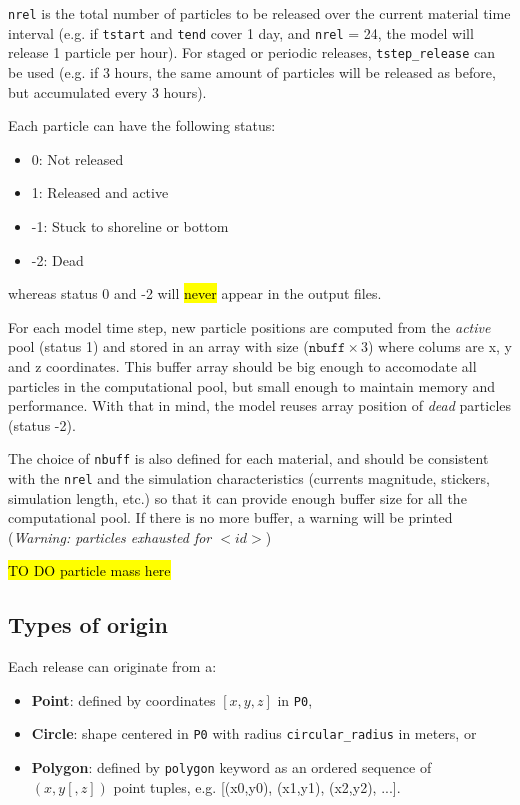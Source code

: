 \documentclass[a4paper]{article}
\begin{document}
\texttt{nrel} is the total number of particles to be released over the current material time interval (e.g. if \texttt{tstart} and \texttt{tend} cover 1 day, and \texttt{nrel} = 24, the model will release 1 particle per hour). For staged or periodic releases, \texttt{tstep\_release} can be used (e.g. if 3 hours, the same amount of particles will be released as before, but accumulated every 3 hours).

Each particle can have the following status:

\begin{itemize}
\item 0: Not released
\item 1: Released and active
\item -1: Stuck to shoreline or bottom
\item -2: Dead
\end{itemize}
 
whereas status 0 and -2 will \hl{never} appear in the output files.

For each model time step, new particle positions are computed from the \textit{active} pool (status 1) and stored in an array with size ($\texttt{nbuff}\times 3$)  where colums are x, y and z coordinates. This buffer array should be big enough to accomodate all particles in the computational pool, but small enough to maintain memory and performance. With that in mind, the model reuses array position of \textit{dead} particles (status -2). 


The choice of \texttt{nbuff} is also defined for each material, and should be consistent with the \texttt{nrel} and the simulation characteristics (currents magnitude, stickers, simulation length, etc.) so that it can provide enough buffer size for all the computational pool. If there is no more buffer, a warning will be printed (\textit{Warning: particles exhausted for  $<id>$})

\bigskip

\hl{TO DO particle mass here}

\bigskip

\subsection{Types of origin}
\label{ssec:origin}

Each release can originate from a:

\begin{itemize} 
\item \textbf{Point}: defined by coordinates $[x,y,z]$ in \texttt{P0}, 
\item \textbf{Circle}: shape centered in  \texttt{P0} with radius \texttt{circular\_radius} in meters, or
\item \textbf{Polygon}: defined by \texttt{polygon} keyword as an ordered sequence of $(x, y[, z])$ point tuples, e.g. [(x0,y0), (x1,y1), (x2,y2), ...]. 
\end{itemize}
\end{document}
